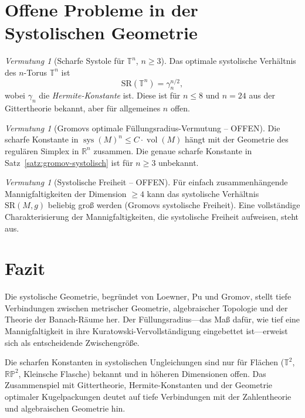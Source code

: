 \documentclass[12pt,a4paper]{amsart}
\theoremstyle{definition}
\theoremstyle{remark}
\newtheorem{vermutung}[theorem]{Vermutung}
\DeclareMathOperator{\sys}{sys}
\DeclareMathOperator{\vol}{vol}
\newcommand{\RR}{\mathbb{R}}
\newcommand{\RP}{\mathbb{RP}}
\newcommand{\TT}{\mathbb{T}}
\begin{document}
\section{Offene Probleme in der Systolischen Geometrie}

\begin{vermutung}[Scharfe Systole für $\TT^n$, $n \ge 3$]
Das optimale systolische Verhältnis des $n$-Torus $\TT^n$ ist
\[
  \mathrm{SR}(\TT^n) = \gamma_n^{n/2},
\]
wobei $\gamma_n$ die \emph{Hermite-Konstante} ist.
Diese ist für $n \le 8$ und $n = 24$ aus der Gittertheorie bekannt,
aber für allgemeines $n$ offen.
\end{vermutung}

\begin{vermutung}[Gromovs optimale Füllungsradius-Vermutung -- OFFEN]
Die scharfe Konstante in $\sys(M)^n \le C \cdot \vol(M)$ hängt mit der
Geometrie des regulären Simplex in $\RR^n$ zusammen.
Die genaue scharfe Konstante in Satz~\ref{satz:gromov-systolisch}
ist für $n \ge 3$ unbekannt.
\end{vermutung}

\begin{vermutung}[Systolische Freiheit -- OFFEN]
Für einfach zusammenhängende Mannigfaltigkeiten der Dimension $\ge 4$
kann das systolische Verhältnis $\mathrm{SR}(M,g)$ beliebig groß werden
(Gromovs \glqq systolische Freiheit\grqq{}).
Eine vollständige Charakterisierung der Mannigfaltigkeiten, die systolische
Freiheit aufweisen, steht aus.
\end{vermutung}

\section{Fazit}

Die systolische Geometrie, begründet von Loewner, Pu und Gromov, stellt
tiefe Verbindungen zwischen metrischer Geometrie, algebraischer Topologie
und der Theorie der Banach-Räume her.
Der Füllungsradius---das Maß dafür, wie tief eine Mannigfaltigkeit in ihre
Kuratowski-Vervollständigung eingebettet ist---erweist sich als
entscheidende Zwischengröße.

Die scharfen Konstanten in systolischen Ungleichungen sind nur für Flächen
($\TT^2$, $\RP^2$, Kleinsche Flasche) bekannt und in höheren Dimensionen
offen.  Das Zusammenspiel mit Gittertheorie, Hermite-Konstanten und der
Geometrie optimaler Kugelpackungen deutet auf tiefe Verbindungen mit der
Zahlentheorie und algebraischen Geometrie hin.
\end{document}
